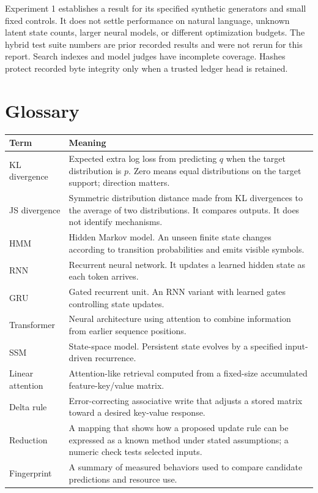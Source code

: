 Experiment 1 establishes a result for its specified synthetic generators and small fixed controls. It does not settle performance on natural language, unknown latent state counts, larger neural models, or different optimization budgets. The hybrid test suite numbers are prior recorded results and were not rerun for this report. Search indexes and model judges have incomplete coverage. Hashes protect recorded byte integrity only when a trusted ledger head is retained.

\appendix
\section{Glossary}

\begin{longtable}{p{3.3cm}p{10.8cm}}
\toprule Term & Meaning \\
\midrule
KL divergence & Expected extra log loss from predicting $q$ when the target distribution is $p$. Zero means equal distributions on the target support; direction matters. \\
JS divergence & Symmetric distribution distance made from KL divergences to the average of two distributions. It compares outputs. It does not identify mechanisms. \\
HMM & Hidden Markov model. An unseen finite state changes according to transition probabilities and emits visible symbols. \\
RNN & Recurrent neural network. It updates a learned hidden state as each token arrives. \\
GRU & Gated recurrent unit. An RNN variant with learned gates controlling state updates. \\
Transformer & Neural architecture using attention to combine information from earlier sequence positions. \\
SSM & State-space model. Persistent state evolves by a specified input-driven recurrence. \\
Linear attention & Attention-like retrieval computed from a fixed-size accumulated feature-key/value matrix. \\
Delta rule & Error-correcting associative write that adjusts a stored matrix toward a desired key-value response. \\
Reduction & A mapping that shows how a proposed update rule can be expressed as a known method under stated assumptions; a numeric check tests selected inputs. \ \\
Fingerprint & A summary of measured behaviors used to compare candidate predictions and resource use. \ \\

\end{longtable}
